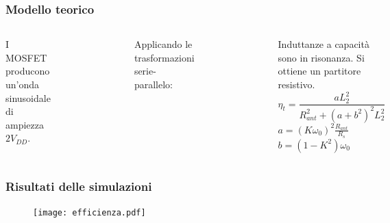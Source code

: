 \documentclass{beamer}
\begin{document}
\begin{frame}
\frametitle{Modello teorico}
\begin{columns}
	I MOSFET producono un'onda sinusoidale di ampiezza $2V_{DD}$.
	\begin{figure}
	\includegraphics[width=\textwidth]{images/cir_model.pdf}
	\end{figure}
	Applicando le trasformazioni serie-parallelo:
	\begin{figure}
	\includegraphics[width=\textwidth]{images/cir_model3.pdf}
	\end{figure}

	Induttanze a capacit\`a sono in risonanza. Si ottiene un partitore
	resistivo.
	\medskip
	$$ \eta_t = \frac{aL_2^2}{R_{ant}^2 + ( a + b^2 )^2L_2^2} $$
	$ a = (K\omega_0)^2\frac{R_{ant}}{R_s} $\\
	\smallskip
	$ b = (1 - K^2)\omega_0 $\\
	\medskip
	\center{}
\end{columns}
\end{frame}
%
\begin{frame}
\frametitle{Risultati delle simulazioni}
\vspace{-0.6cm} %
\begin{figure}
\centering
\texttt{[image: efficienza.pdf]}
\end{figure}
\end{frame}
\end{document}
